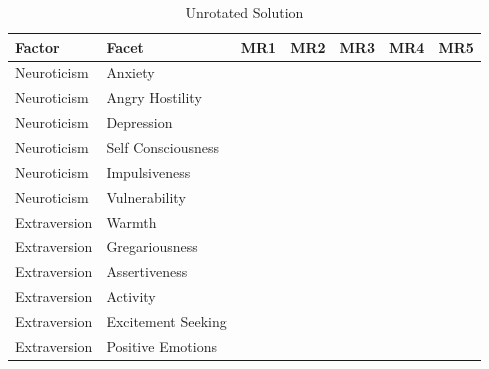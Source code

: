 \documentclass{article}\usepackage[]{graphicx}\usepackage[]{color}
\begin{document}
\begin{table}
\caption{\label{tab:unnamed-chunk-14}Unrotated Solution}
\centering
\begin{tabular}[t]{lllllll}
\toprule
Factor & Facet & MR1 & MR2 & MR3 & MR4 & MR5\\
\midrule
Neuroticism & Anxiety & \cellcolor{white}{-0.44} & \cellcolor{white}{-0.25} & \cellcolor{yellow}{0.66} & \cellcolor{white}{0.21} & \cellcolor{white}{0.06}\\
Neuroticism & Angry Hostility & \cellcolor{white}{-0.44} & \cellcolor{white}{-0.13} & \cellcolor{white}{0.04} & \cellcolor{yellow}{0.71} & \cellcolor{white}{0.02}\\
Neuroticism & Depression & \cellcolor{white}{-0.63} & \cellcolor{white}{-0.04} & \cellcolor{yellow}{0.56} & \cellcolor{white}{0.21} & \cellcolor{white}{-0.01}\\
Neuroticism & Self Consciousness & \cellcolor{white}{-0.49} & \cellcolor{white}{-0.3} & \cellcolor{yellow}{0.52} & \cellcolor{white}{0.02} & \cellcolor{white}{0.05}\\
Neuroticism & Impulsiveness & \cellcolor{white}{-0.23} & \cellcolor{white}{0.25} & \cellcolor{white}{0.28} & \cellcolor{white}{0.37} & \cellcolor{white}{-0.18}\\
\addlinespace
Neuroticism & Vulnerability & \cellcolor{white}{-0.63} & \cellcolor{white}{-0.12} & \cellcolor{white}{0.48} & \cellcolor{white}{0.14} & \cellcolor{white}{-0.1}\\
Extraversion & Warmth & \cellcolor{yellow}{0.61} & \cellcolor{white}{0.28} & \cellcolor{white}{0.36} & \cellcolor{white}{0.09} & \cellcolor{white}{-0.36}\\
Extraversion & Gregariousness & \cellcolor{white}{0.48} & \cellcolor{white}{0.29} & \cellcolor{white}{0.12} & \cellcolor{white}{0.26} & \cellcolor{white}{-0.32}\\
Extraversion & Assertiveness & \cellcolor{yellow}{0.58} & \cellcolor{white}{0.04} & \cellcolor{white}{-0.16} & \cellcolor{white}{0.38} & \cellcolor{white}{-0.12}\\
Extraversion & Activity & \cellcolor{yellow}{0.54} & \cellcolor{white}{-0.01} & \cellcolor{white}{0.07} & \cellcolor{white}{0.44} & \cellcolor{white}{0.02}\\
\addlinespace
Extraversion & Excitement Seeking & \cellcolor{white}{0.24} & \cellcolor{white}{0.38} & \cellcolor{white}{-0.03} & \cellcolor{white}{0.23} & \cellcolor{white}{-0.02}\\
Extraversion & Positive Emotions & \cellcolor{yellow}{0.69} & \cellcolor{white}{0.36} & \cellcolor{white}{0.19} & \cellcolor{white}{0.05} & \cellcolor{white}{-0.04}\\

\end{tabular}
\end{table}
\end{document}
